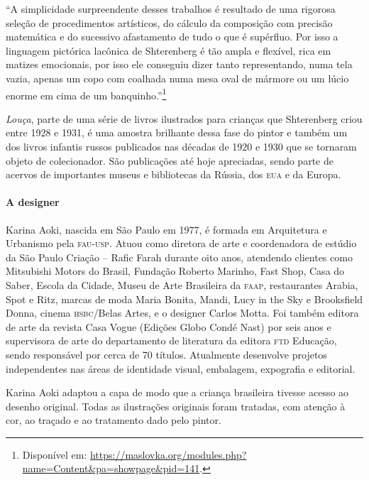 \documentclass[11pt]{extarticle}
\begin{document}
“A simplicidade surpreendente desses trabalhos é resultado de uma rigorosa seleção de procedimentos artísticos, do cálculo da composição com precisão matemática e do sucessivo afastamento de tudo o que é supérfluo. Por isso a linguagem pictórica lacônica de Shterenberg é tão ampla e flexível, rica em matizes emocionais, por isso ele conseguiu dizer tanto representando, numa tela vazia, apenas um copo com coalhada numa mesa oval de mármore ou um lúcio enorme em cima de um banquinho.”\footnote{Disponível em: \url{https://maslovka.org/modules.php?name=Content&pa=showpage&pid=141}.} 

\textit{Louça}, parte de uma série de livros ilustrados para crianças que Shterenberg criou entre 1928 e 1931, é uma amostra brilhante dessa fase do pintor e também um dos livros infantis russos publicados nas décadas de 1920 e 1930 que se tornaram objeto de colecionador. São publicações até hoje apreciadas, sendo parte de acervos de importantes museus e bibliotecas da Rússia, dos \textsc{eua} e da Europa.

\paragraph{A designer} Karina Aoki, nascida em São Paulo em 1977, é formada em Arquitetura e Urbanismo pela \textsc{fau-usp}. Atuou como diretora de arte e coordenadora de estúdio da São Paulo Criação -- Rafic Farah durante oito anos, atendendo clientes como Mitsubishi Motors do Brasil, Fundação Roberto Marinho, Fast Shop, Casa do Saber, Escola da Cidade, Museu de Arte Brasileira da \textsc{faap}, restaurantes Arabia, Spot e Ritz, marcas de moda Maria Bonita, Mandi, Lucy in the Sky e
Brooksfield Donna, cinema \textsc{hsbc}/Belas Artes, e o designer Carlos Motta. Foi também editora de arte da revista Casa Vogue (Edições Globo Condé Nast) por seis anos e supervisora de arte do departamento de literatura da editora \textsc{ftd} Educação, sendo responsável por cerca de 70 títulos. Atualmente desenvolve projetos independentes nas áreas de identidade visual, embalagem, expografia e editorial.

Karina Aoki adaptou a capa de modo que a criança brasileira tivesse acesso ao
desenho original. Todas as ilustrações originais foram tratadas, com atenção à cor, ao traçado e ao tratamento dado pelo pintor.

\end{document}
